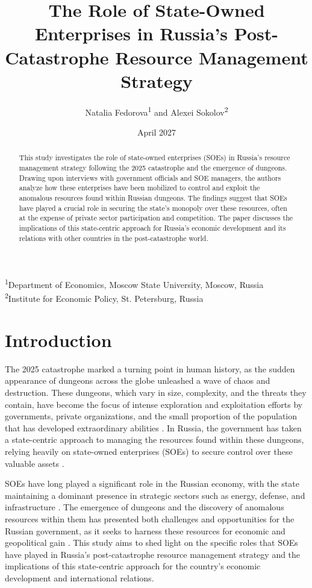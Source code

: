 \documentclass[12pt, a4paper]{article}
\title{The Role of State-Owned Enterprises in Russia's Post-Catastrophe Resource Management Strategy}
\author{Natalia Fedorova\textsuperscript{1} and Alexei Sokolov\textsuperscript{2}}
\date{April 2027}
\begin{document}
\maketitle

\textsuperscript{1}Department of Economics, Moscow State University, Moscow, Russia\\
\textsuperscript{2}Institute for Economic Policy, St. Petersburg, Russia

\begin{abstract}
This study investigates the role of state-owned enterprises (SOEs) in Russia's resource management strategy following the 2025 catastrophe and the emergence of dungeons. Drawing upon interviews with government officials and SOE managers, the authors analyze how these enterprises have been mobilized to control and exploit the anomalous resources found within Russian dungeons. The findings suggest that SOEs have played a crucial role in securing the state's monopoly over these resources, often at the expense of private sector participation and competition. The paper discusses the implications of this state-centric approach for Russia's economic development and its relations with other countries in the post-catastrophe world.
\end{abstract}

\section{Introduction}
The 2025 catastrophe marked a turning point in human history, as the sudden appearance of dungeons across the globe unleashed a wave of chaos and destruction. These dungeons, which vary in size, complexity, and the threats they contain, have become the focus of intense exploration and exploitation efforts by governments, private organizations, and the small proportion of the population that has developed extraordinary abilities \citep{Mikhailov2026, Petrov2027}. In Russia, the government has taken a state-centric approach to managing the resources found within these dungeons, relying heavily on state-owned enterprises (SOEs) to secure control over these valuable assets \citep{Ivanov2026}.

SOEs have long played a significant role in the Russian economy, with the state maintaining a dominant presence in strategic sectors such as energy, defense, and infrastructure \citep{Goldman2008, Sprenger2010}. The emergence of dungeons and the discovery of anomalous resources within them has presented both challenges and opportunities for the Russian government, as it seeks to harness these resources for economic and geopolitical gain \citep{Smirnov2026}. This study aims to shed light on the specific roles that SOEs have played in Russia's post-catastrophe resource management strategy and the implications of this state-centric approach for the country's economic development and international relations.
\end{document}
